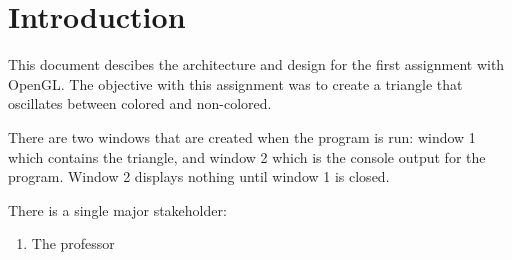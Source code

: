 \section{Introduction}
\label{section:intro}

This document descibes the architecture and design for the first assignment with OpenGL.
The objective with this assignment was to create a triangle that oscillates between colored and non-colored.

There are two windows that are created when the program is run:
window 1 which contains the triangle, and window 2 which is the console output for the program.
Window 2 displays nothing until window 1 is closed.

\vspace{0.1cm}

There is a single major stakeholder:
\begin{enumerate}
    \item The professor
\end{enumerate}